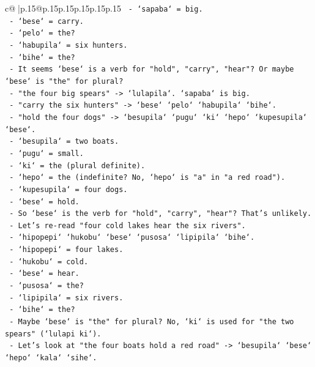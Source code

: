 \documentclass{article}
\begin{document}
{\begin{supertabular}{c@{$\;$}|p{.15\linewidth}@{}p{.15\linewidth}p{.15\linewidth}p{.15\linewidth}p{.15\linewidth}p{.15\linewidth}}
{{{\texttt{      {-} `sapaba` = big.} \\
\texttt{      {-} `bese` = carry.} \\
\texttt{      {-} `pelo` = the?} \\
\texttt{      {-} `habupila` = six hunters.} \\
\texttt{      {-} `bihe` = the?} \\
\texttt{    {-} It seems `bese` is a verb for "hold", "carry", "hear"? Or maybe `bese` is "the" for plural?} \\
\texttt{    {-} "the four big spears" {-}> `lulapila`. `sapaba` is big.} \\
\texttt{    {-} "carry the six hunters" {-}> `bese` `pelo` `habupila` `bihe`.} \\
\texttt{    {-} "hold the four dogs" {-}> `besupila` `pugu` `ki` `hepo` `kupesupila` `bese`.} \\
\texttt{      {-} `besupila` = two boats.} \\
\texttt{      {-} `pugu` = small.} \\
\texttt{      {-} `ki` = the (plural definite).} \\
\texttt{      {-} `hepo` = the (indefinite? No, `hepo` is "a" in "a red road").} \\
\texttt{      {-} `kupesupila` = four dogs.} \\
\texttt{      {-} `bese` = hold.} \\
\texttt{    {-} So `bese` is the verb for "hold", "carry", "hear"? That's unlikely.} \\
\texttt{    {-} Let's re{-}read "four cold lakes hear the six rivers".} \\
\texttt{      {-} `hipopepi` `hukobu` `bese` `pusosa` `lipipila` `bihe`.} \\
\texttt{      {-} `hipopepi` = four lakes.} \\
\texttt{      {-} `hukobu` = cold.} \\
\texttt{      {-} `bese` = hear.} \\
\texttt{      {-} `pusosa` = the?} \\
\texttt{      {-} `lipipila` = six rivers.} \\
\texttt{      {-} `bihe` = the?} \\
\texttt{    {-} Maybe `bese` is "the" for plural? No, `ki` is used for "the two spears" (`lulapi ki`).} \\
\texttt{    {-} Let's look at "the four boats hold a red road" {-}> `besupila` `bese` `hepo` `kala` `sihe`.} \\
}}}
\end{supertabular}}
\end{document}
